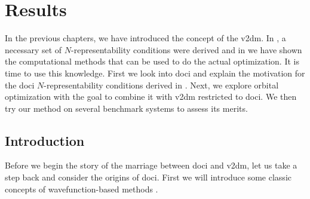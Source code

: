 \chapter{Results}\label{ch5}
In the previous chapters, we have introduced the concept of the \acrlong{v2dm}.
In , a necessary set of $N$-representability conditions were derived and in  we have shown the computational methods
that can be used to do the actual optimization.
It is time to use this knowledge. First we look into \gls{doci} and explain the motivation for the \gls{doci} $N$-representability conditions derived in .
Next, we explore orbital optimization with the goal to combine it with \gls{v2dm} restricted to \gls{doci}. We then try our method on several
benchmark systems to assess its merits.

\section{Introduction}\label{ch5-doci-intro}

Before we begin the story of the marriage between \gls{doci} and \gls{v2dm}, let us take a step back and consider the origins of
\gls{doci}. First we will introduce some classic concepts of wavefunction-based methods \citep{helgaker2007molecular}.

